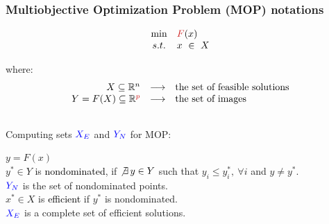 \documentclass[]{beamer}
\newcommand{\mR}{\mathbb{R}}
\newcommand*{\red}[1]{{\color{nred}#1}}
\begin{document}
% 
%
\begin{frame}[fragile]
  \frametitle{Multiobjective Optimization Problem (MOP) notations}

\[
\begin{array}{clrclrrrl}
\min   & \red{F}(x)   \\
s.t.     & x  \ \in \ X
\end{array}
\]


\vspace{-2mm}
\noindent 
where:
\vspace{2mm}
$$
\begin{array}{rcl}
%
X \subseteq\mR^n  & \longrightarrow & \hbox{the set of feasible solutions}\\
Y=F(X)\subseteq \mR^{\red{p}} & \longrightarrow & \hbox{the set of images}\\
\notag
\end{array}
$$

\hspace{0mm}Computing sets $\textcolor{blue}{X_E}$  and $\textcolor{blue}{Y_N}$ for MOP:

\vspace{0mm}

\begin{center}
{$y=F(x)$\medskip\\
$y^*\in Y$ is \textcolor{black}{nondominated}, if $\not\exists\, y\in Y$ such that $y_i\leq y^*_i,~\forall i$ and $ y\not= y^*$.\\
			$\textcolor{blue}{Y_N}$ is the set of nondominated points.\medskip\\
			$x^*\in X$ is \textcolor{black}{efficient} if $y^*$ is nondominated.\\
			$\textcolor{blue}{X_E}$ is a complete set of efficient solutions.}

\end{center}
\vspace{5mm}


\end{frame}
\end{document}
